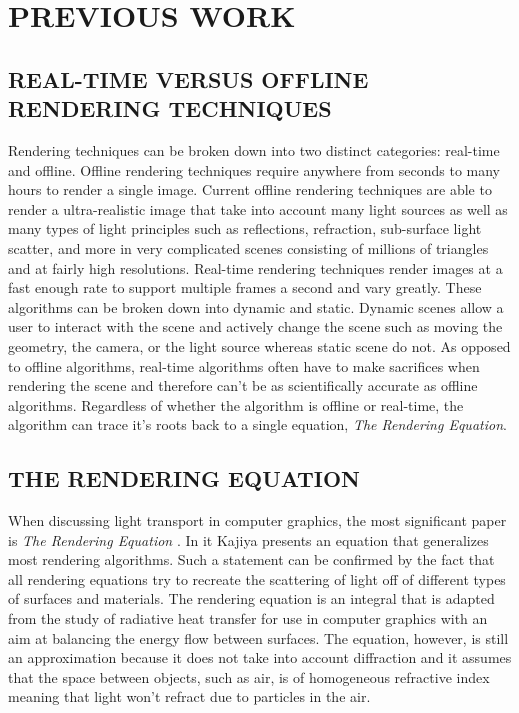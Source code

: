 \chapter{PREVIOUS WORK}

\section{REAL-TIME VERSUS OFFLINE RENDERING TECHNIQUES}

Rendering techniques can be broken down into two distinct categories: real-time and offline.  Offline rendering techniques require anywhere from seconds to many hours to render a single image.  Current offline rendering techniques are able to render a ultra-realistic image that take into account many light sources as well as many types of light principles such as reflections, refraction, sub-surface light scatter, and more in very complicated scenes consisting of millions of triangles and at fairly high resolutions.  Real-time rendering techniques render images at a fast enough rate to support multiple frames a second and vary greatly.  These algorithms can be broken down into dynamic and static.  Dynamic scenes allow a user to interact with the scene and actively change the scene such as moving the geometry, the camera, or the light source whereas static scene do not.  As opposed to offline algorithms, real-time algorithms often have to make sacrifices when rendering the scene and therefore can't be as scientifically accurate as offline algorithms.  Regardless of whether the algorithm is offline or real-time, the algorithm can trace it's roots back to a single equation, \textit{The Rendering Equation}.

\section{THE RENDERING EQUATION}

When discussing light transport in computer graphics, the most significant paper is \textit{The Rendering Equation} \cite{Kajiya1986}.  In it Kajiya presents an equation that generalizes most rendering algorithms.  Such a statement can be confirmed by the fact that all rendering equations try to recreate the scattering of light off of different types of surfaces and materials.  The rendering equation is an integral that is adapted from the study of radiative heat transfer for use in computer graphics with an aim at balancing the energy flow between surfaces.  The equation, however, is still an approximation because it does not take into account diffraction and it assumes that the space between objects, such as air, is of homogeneous refractive index meaning that light won't refract due to particles in the air.

